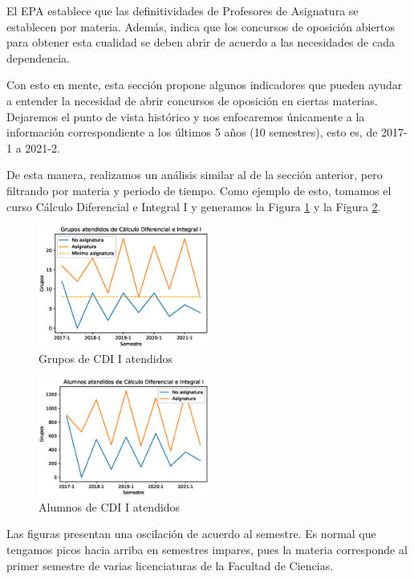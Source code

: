 \documentclass[twocolumn]{article}
\theoremstyle{definition}
\begin{document}
El EPA establece que las definitividades de Profesores de Asignatura se establecen por materia. Además, indica que los concursos de oposición abiertos para obtener esta cualidad se deben abrir de acuerdo a las necesidades de cada dependencia.

Con esto en mente, esta sección propone algunos indicadores que pueden ayudar a entender la necesidad de abrir concursos de oposición en ciertas materias. Dejaremos el punto de vista histórico y nos enfocaremos únicamente a la información correspondiente a los últimos 5 años (10 semestres), esto es, de 2017-1 a 2021-2.

De esta manera, realizamos un análisis similar al de la sección anterior, pero filtrando por materia y periodo de tiempo. Como ejemplo de esto, tomamos el curso Cálculo Diferencial e Integral I y generamos la Figura \ref{fig:calcgroups} y la Figura \ref{fig:calcstudents}.

\begin{figure}
    \centering
    \includegraphics[width=0.5\textwidth]{fig/calculo_grupos.eps}
    \caption{Grupos de CDI I atendidos}
    \label{fig:calcgroups}
\end{figure}


\begin{figure}
    \centering
    \includegraphics[width=0.5\textwidth]{fig/calculo_alumnos.eps}
    \caption{Alumnos de CDI I atendidos}
    \label{fig:calcstudents}
\end{figure}

Las figuras presentan una oscilación de acuerdo al semestre. Es normal que tengamos picos hacia arriba en semestres impares, pues la materia corresponde al primer semestre de varias licenciaturas de la Facultad de Ciencias.
\end{document}

